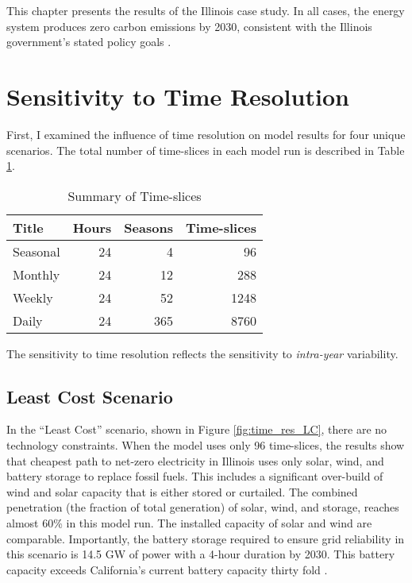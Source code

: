 This chapter presents the results of the Illinois case study. In all cases, the
energy system produces zero carbon emissions by 2030, consistent with the Illinois
government's stated policy goals
\cite{harmon_climate_2021,office_of_governor_jb_pritzker_gov_2021}.
\section{Sensitivity to Time Resolution}
\label{section:time_res}

First, I examined the influence of time resolution on model results for four
unique scenarios. The total number of time-slices in each model run is
described in Table \ref{tab:time-slices}.

\begin{table}[H]
  \centering
  \caption{Summary of Time-slices}
  \label{tab:time-slices}
  \begin{tabular}{lrrr}
    \toprule
    Title & Hours & Seasons & Time-slices \\
    \midrule
    Seasonal & 24 & 4 & 96\\
    Monthly & 24 & 12 & 288\\
    Weekly & 24 & 52 & 1248\\
    Daily & 24 & 365 & 8760\\
    \bottomrule
  \end{tabular}
\end{table}
The sensitivity to time resolution reflects the sensitivity to \textit{intra-year}
variability.

\subsection{Least Cost Scenario}

In the ``Least Cost'' scenario, shown in Figure \ref{fig:time_res_LC},
there are no technology constraints. When the model uses only 96 time-slices,
the results show that cheapest path to net-zero electricity in Illinois uses
only solar, wind, and battery storage to replace fossil fuels. This includes
a significant over-build of wind and solar capacity that is either stored
or curtailed. The combined penetration (the fraction of total generation)
of solar, wind, and storage, reaches almost 60\% in this model run. The installed
capacity of solar and wind are comparable. Importantly, the battery storage
required to ensure grid reliability in this scenario is 14.5 GW of power with
a 4-hour duration by 2030. This battery capacity exceeds California's current
battery capacity thirty fold \cite{hutchins_us_2021}.

